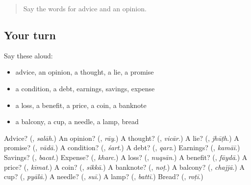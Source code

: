 \begin{quote}
Say the words for advice and an opinion.
\end{quote}

\subsection*{Your turn}
Say these aloud:

\begin{itemize}
\raggedright
  \item advice, an opinion, a thought, a lie, a promise
  \item a condition, a debt, earnings, savings, expense
  \item a loss, a benefit, a price, a coin, a banknote
  \item a balcony, a cup, a needle, a lamp, bread
\end{itemize}

\begin{tcolorbox}[breakable,colback=teal!4,colframe=teal!35!black,title={Before you move on}]
Advice? (\textbf{}, \emph{salāh}.) An opinion? (\textbf{}, \emph{rāy}.) A thought? (\textbf{}, \emph{vicār}.) A lie? (\textbf{}, \emph{jhūṭh}.) A promise? (\textbf{}, \emph{vādā}.) A condition? (\textbf{}, \emph{śart}.) A debt? (\textbf{}, \emph{qarz}.) Earnings? (\textbf{}, \emph{kamāī}.) Savings? (\textbf{}, \emph{bacat}.) Expense? (\textbf{}, \emph{kharc}.) A loss? (\textbf{}, \emph{nuqsān}.) A benefit? (\textbf{}, \emph{fāydā}.) A price? (\textbf{}, \emph{kīmat}.) A coin? (\textbf{}, \emph{sikkā}.) A banknote? (\textbf{}, \emph{noṭ}.) A balcony? (\textbf{}, \emph{chajjā}.) A cup? (\textbf{}, \emph{pyālā}.) A needle? (\textbf{}, \emph{suī}.) A lamp? (\textbf{}, \emph{battī}.) Bread? (\textbf{}, \emph{roṭī}.)
\end{tcolorbox}
